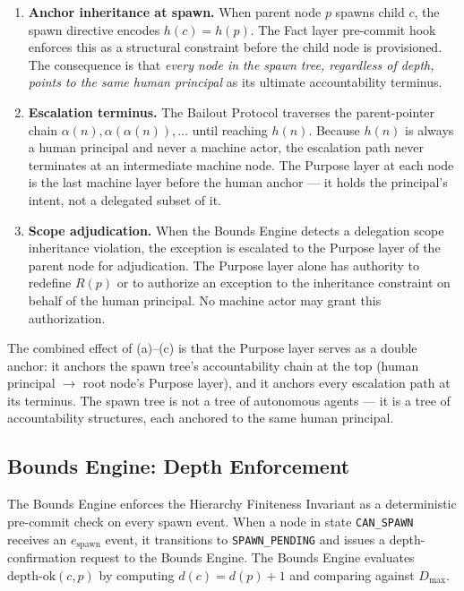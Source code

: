 \begin{enumerate}
  \item[(a)] \textbf{Anchor inheritance at spawn.}  When parent node $p$ spawns
    child $c$, the spawn directive encodes $h(c) = h(p)$.  The Fact layer
    pre-commit hook enforces this as a structural constraint before the child
    node is provisioned.  The consequence is that \emph{every node in the
    spawn tree, regardless of depth, points to the same human principal} as
    its ultimate accountability terminus.

  \item[(b)] \textbf{Escalation terminus.}  The Bailout Protocol traverses the
    parent-pointer chain $\alpha(n), \alpha(\alpha(n)), \ldots$ until reaching
    $h(n)$.  Because $h(n)$ is always a human principal and never a machine
    actor, the escalation path never terminates at an intermediate machine
    node.  The Purpose layer at each node is the last machine layer before the
    human anchor --- it holds the principal's intent, not a delegated subset
    of it.

  \item[(c)] \textbf{Scope adjudication.}  When the Bounds Engine detects a
    delegation scope inheritance violation, the exception is escalated to the
    Purpose layer of the parent node for adjudication.  The Purpose layer alone
    has authority to redefine $R(p)$ or to authorize an exception to the
    inheritance constraint on behalf of the human principal.  No machine actor
    may grant this authorization.
\end{enumerate}

The combined effect of (a)--(c) is that the Purpose layer serves as a double
anchor: it anchors the spawn tree's accountability chain at the top (human
principal $\rightarrow$ root node's Purpose layer), and it anchors every
escalation path at its terminus.  The spawn tree is not a tree of autonomous
agents --- it is a tree of accountability structures, each anchored to the
same human principal.

\subsection{Bounds Engine: Depth Enforcement}
\label{sec:rs-bounds-depth}

The Bounds Engine enforces the Hierarchy Finiteness Invariant as a deterministic
pre-commit check on every spawn event.  When a node in state \texttt{CAN\_SPAWN}
receives an $e_{\text{spawn}}$ event, it transitions to \texttt{SPAWN\_PENDING}
and issues a depth-confirmation request to the Bounds Engine.  The Bounds
Engine evaluates $\text{depth-ok}(c, p)$ by computing $d(c) = d(p) + 1$ and
comparing against $D_{\max}$.

